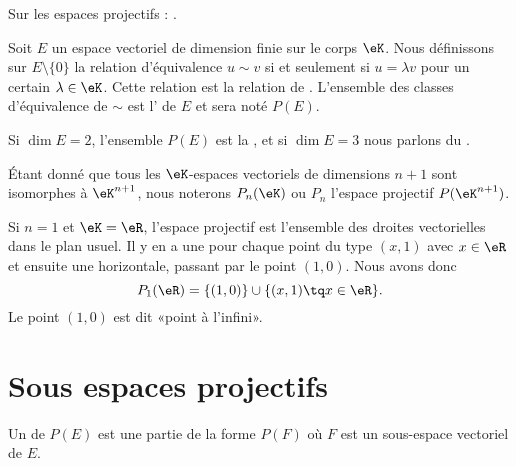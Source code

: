 
Sur les espaces projectifs : \cite{ProjRolland}.

\begin{definition}
    Soit \( E\) un espace vectoriel de dimension finie sur le corps \( \eK\). Nous définissons sur \( E\setminus\{ 0 \}\) la relation d'équivalence \( u\sim v\) si et seulement si \( u=\lambda v\) pour un certain \( \lambda\in\eK\). Cette relation est la relation de . L'ensemble des classes d'équivalence de \( \sim\) est l' de \( E\) et sera noté \( P(E)\).
\end{definition}

Si \( \dim E=2\), l'ensemble \( P(E)\) est la , et si \( \dim E=3\) nous parlons du .

Étant donné que tous les \( \eK\)-espaces vectoriels de dimensions \( n+1\) sont isomorphes à \( \eK^{n+1}\), nous noterons \( P_n(\eK)\) ou \( P_n\) l'espace projectif \( P(\eK^{n+1})\). \label{PgNotimesjNtMoW}

\begin{example}
    Si \( n=1\) et \( \eK=\eR\), l'espace projectif est l'ensemble des droites vectorielles dans le plan usuel. Il y en a une pour chaque point du type \( (x,1)\) avec \( x\in\eR\) et ensuite une horizontale, passant par le point \( (1,0)\). Nous avons donc
    \begin{equation}
        P_1(\eR)=\{ (1,0) \}\cup\{ (x,1)\tq x\in \eR \}.
    \end{equation}
    Le point \( (1,0)\) est dit «point à l'infini».
\end{example}

\section{Sous espaces projectifs}

Un  de \( P(E)\) est une partie de la forme \( P(F)\) où \( F\) est un sous-espace vectoriel de \( E\).


